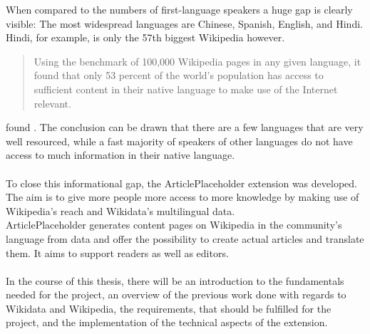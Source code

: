 When compared to the numbers of first-language speakers a huge gap is clearly visible: The most widespread languages are Chinese, Spanish, English, and Hindi. Hindi, for example, is only the 57th biggest Wikipedia however.
\begin{quote}
Using the benchmark of 100,000 Wikipedia pages in any given language, it found that only 53 percent of the world’s population has access to sufficient content in their native language to make use of the Internet relevant.
\end{quote} 
found \citet{atlanticLang}.
The conclusion can be drawn that there are a few languages that are very well resourced, while a fast majority of speakers of other languages do not have access to much information in their native language.  \\
\\
To close this informational gap, the ArticlePlaceholder extension was developed. The aim is to give more people more access to more knowledge by making use of Wikipedia’s reach and Wikidata’s multilingual data. \\
ArticlePlaceholder generates content pages on Wikipedia in the community's language from data and offer the possibility to create actual articles and translate them. It aims to support readers as well as editors. \\
\\
In the course of this thesis, there will be an introduction to the fundamentals needed for the project, an overview of the previous work done with regards to Wikidata and Wikipedia, the requirements, that should be fulfilled for the project, and the implementation of the technical aspects of the extension. 